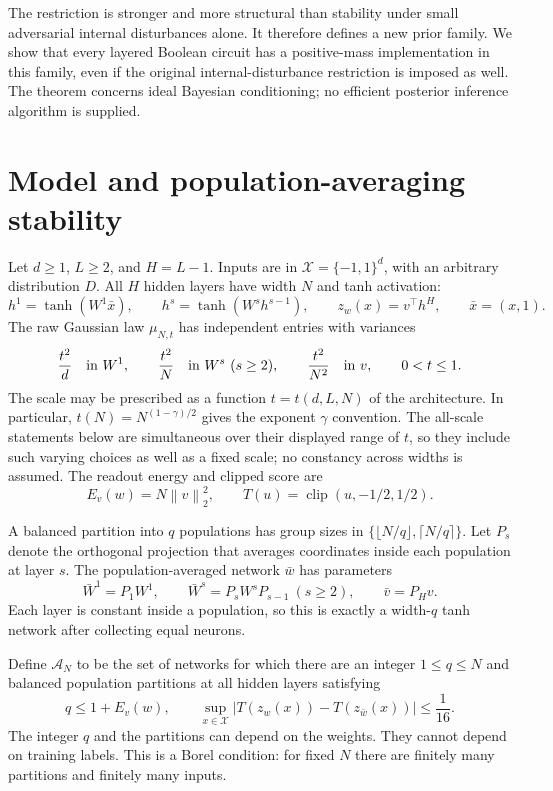\documentclass[11pt]{article}
\newcommand{\norm}[1]{\left\|#1\right\|}
\newcommand{\clip}{\operatorname{clip}}
\begin{document}
The restriction is stronger and more structural than stability under small
adversarial internal disturbances alone. It therefore defines a new prior
family. We show that every layered Boolean circuit has a positive-mass
implementation in this family, even if the original internal-disturbance
restriction is imposed as well. The theorem concerns ideal Bayesian
conditioning; no efficient posterior inference algorithm is supplied.

\section{Model and population-averaging stability}

Let $d\ge1$, $L\ge2$, and $H=L-1$. Inputs are in
$\mathcal X=\{-1,1\}^d$, with an arbitrary distribution $D$.
All $H$ hidden layers have width $N$ and tanh activation:
\[
 h^1=\tanh(W^1\bar x),\qquad
 h^s=\tanh(W^sh^{s-1}),\qquad
 z_w(x)=v^\top h^H,\qquad \bar x=(x,1).
\]
The raw Gaussian law $\mu_{N,t}$ has independent entries with variances
\[
 \frac{t^2}{d}\quad\hbox{in }W^1,\qquad
 \frac{t^2}{N}\quad\hbox{in }W^s\ (s\ge2),\qquad
 \frac{t^2}{N^2}\quad\hbox{in }v,
 \qquad 0<t\le1.
\]
The scale may be prescribed as a function $t=t(d,L,N)$ of the
architecture. In particular, $t(N)=N^{(1-\gamma)/2}$ gives the exponent
$\gamma$ convention. The all-scale statements below are simultaneous
over their displayed range of $t$, so they include such varying choices
as well as a fixed scale; no constancy across widths is assumed.
The readout energy and clipped score are
\[
 E_v(w)=N\norm v_2^2,\qquad T(u)=\clip(u,-1/2,1/2).
\]

A balanced partition into $q$ populations has group sizes in
$\{\lfloor N/q\rfloor,\lceil N/q\rceil\}$. Let $P_s$ denote the
orthogonal projection that averages coordinates inside each population at
layer $s$. The population-averaged network $\bar w$ has parameters
\begin{equation}\label{eq:projection}
 \bar W^1=P_1W^1,\qquad
 \bar W^s=P_sW^sP_{s-1}\ (s\ge2),\qquad
 \bar v=P_Hv.
\end{equation}
Each layer is constant inside a population, so this is exactly a width-$q$
tanh network after collecting equal neurons.

Define $\mathcal A_N$ to be the set of networks for which there are an
integer $1\le q\le N$ and balanced population partitions at all hidden
layers satisfying
\begin{equation}\label{eq:population-condition}
 q\le1+E_v(w),\qquad
 \sup_{x\in\mathcal X}|T(z_w(x))-T(z_{\bar w}(x))|\le\frac1{16}.
\end{equation}
The integer $q$ and the partitions can depend on the weights. They cannot
depend on training labels. This is a Borel condition: for fixed $N$ there
are finitely many partitions and finitely many inputs.
\end{document}
